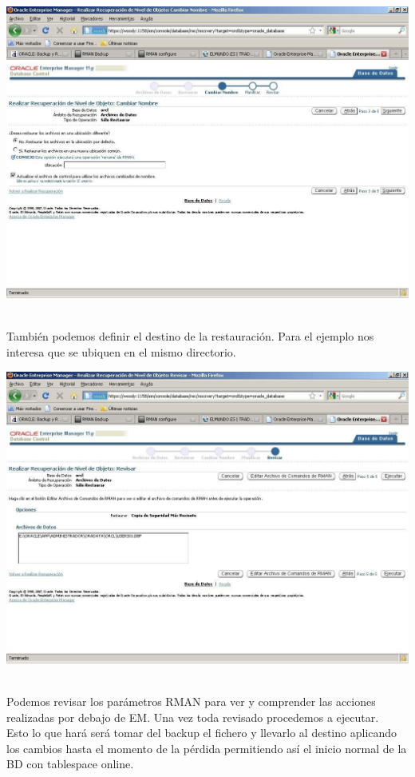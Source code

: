 \begin{enumerate}[1.]
\begin{center}
	\includegraphics[width=15cm]{./Imagenes/recu_5}  
	\end{center}	
	\\También podemos definir el destino de la restauración. Para el ejemplo nos interesa que se ubiquen en el mismo directorio.
	\begin{center}
	\includegraphics[width=15cm]{./Imagenes/recu_6}  
	\end{center}	
	\\Podemos revisar los parámetros RMAN para ver y comprender las acciones realizadas por debajo de EM. Una vez toda revisado procedemos a ejecutar.
	\\Esto lo que hará será tomar del backup el fichero y llevarlo al destino aplicando los cambios  hasta  el  momento  de  la  pérdida  permitiendo  así  el  inicio  normal  de  la  BD  con tablespace online.

\end{enumerate}
